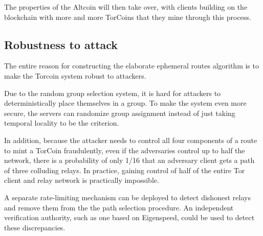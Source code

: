 The properties of the Altcoin will then take over, with clients building on the blockchain with more and more TorCoins that they mine through this process.

\subsection{Robustness to attack}
The entire reason for constructing the elaborate ephemeral routes algorithm is to make the Torcoin system robust to attackers.

Due to the random group selection system, it is hard for attackers to deterministically place themselves in a group. To make the system even more secure, the servers can randomize group assignment instead of just taking temporal locality to be the criterion.

In addition, because the attacker needs to control all four components of a route to mint a TorCoin fraudulently, even if the adversaries control up to half the network, there is a probability of only 1/16 that an adversary client gets a path of three colluding relays. In practice, gaining control of half of the entire Tor client and relay network is practically impossible. 

A separate rate-limiting mechanism can be deployed to detect dishonest relays and remove them from the the path selection procedure. An independent verification authority, such as one based on Eigenspeed, could be used to detect these discrepancies.
